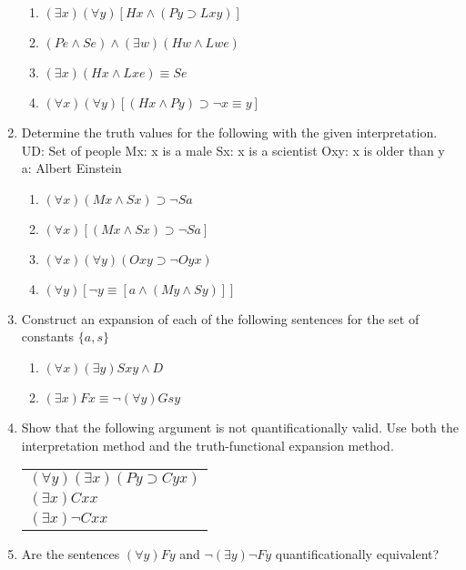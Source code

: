 \documentclass[12pt,letterpaper]{article}
\begin{document}
\begin{enumerate}
      \begin{enumerate}
        \item $(\exists x)(\forall y)[Hx \land (Py \supset Lxy)]$
        \item $(Pe \land Se) \land (\exists w)(Hw \land Lwe)$
        \item $(\exists x)(Hx \land Lxe) \equiv Se$
        \item $(\forall x)(\forall y)[(Hx \land Py) \supset \neg x \equiv y]$
      \end{enumerate}
    \item Determine the truth values for the following with the given interpretation.
      UD: Set of people
      Mx: x is a male
      Sx: x is a scientist
      Oxy: x is older than y
      a: Albert Einstein

      \begin{enumerate}
        \item $(\forall x)(Mx \land Sx) \supset \neg Sa$
        \item $(\forall x)[(Mx \land Sx) \supset \neg Sa]$
        \item $(\forall x)(\forall y)(Oxy \supset \neg Oyx)$
        \item $(\forall y)[\neg y \equiv [a \land (My \land Sy)]]$
      \end{enumerate}
    \item Construct an expansion of each of the following sentences for the set of constants $\{ a, s \}$
      \begin{enumerate}
        \item $(\forall x)(\exists y)Sxy \land D$
        \item $(\exists x)Fx \equiv \neg (\forall y)Gsy$
      \end{enumerate}
    \item
      Show that the following argument is not quantificationally valid.
      Use both the interpretation method and the truth-functional expansion method.

      \begin{tabular}{l}
        $(\forall y)(\exists x)(Py \supset Cyx)$ \\
        $(\exists x)Cxx$ \\
        \hline
        $(\exists x)\neg Cxx$
      \end{tabular}
    \item
      Are the sentences $(\forall y)Fy$ and $\neg (\exists y) \neg Fy$
      quantificationally equivalent?
  \end{enumerate}
\end{document}
